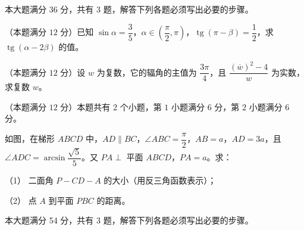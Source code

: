 本大题满分 36 分，共有 3 题，解答下列各题必须写出必要的步骤。

\begin{question}
（本题满分 $12$ 分）已知 $\sin\alpha=\dfrac35$，$\alpha\in\left(\dfrac\pi2,\pi\right)$，$\operatorname{tg}(\pi-\beta)=\dfrac12$，求 $\operatorname{tg}(\alpha-2\beta)$ 的值。

\end{question}
\begin{question}
（本题满分 $12$ 分）设 $w$ 为复数，它的辐角的主值为 $\dfrac{3\pi}4$，且 $\dfrac{(\overline w)^2-4}{w}$ 为实数，求复数 $w$。

\Needspace{0.4\textheight}
\end{question}
\begin{question}
（本题满分 $12$ 分）本题共有 $2$ 个小题，第 $1$ 小题满分 $6$ 分，第 $2$ 小题满分 $6$ 分。

如图，在梯形 $ABCD$ 中，$AD\parallel BC$，$\angle ABC=\dfrac\pi2$，$AB=a$，$AD=3a$，且 $\angle ADC=\arcsin\dfrac{\sqrt5}{5}$。又 $PA\perp$ 平面 $ABCD$，$PA=a$。求：
\nopagebreak[4]
\begin{center}\end{center}
\nopagebreak[4]
（1） 二面角 $P-CD-A$ 的大小（用反三角函数表示）；

（2） 点 $A$ 到平面 $PBC$ 的距离。

\end{question}

本大题满分 54 分，共有 3 题，解答下列各题必须写出必要的步骤。

